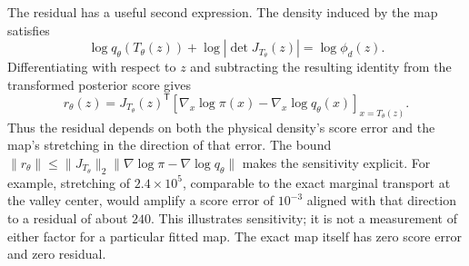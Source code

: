 The residual has a useful second expression. The density induced by the map
satisfies
\begin{equation}
 \log q_\theta(T_\theta(z))+\log|\det J_{T_\theta}(z)|
 =\log\phi_d(z).
\end{equation}
Differentiating with respect to $z$ and subtracting the resulting identity
from the transformed posterior score gives
\begin{equation}
 r_\theta(z)=J_{T_\theta}(z)^\mathsf T
 \left[\nabla_x\log\pi(x)-\nabla_x\log q_\theta(x)\right]_{x=T_\theta(z)}.
 \label{eq:controlled-score-error-amplification}
\end{equation}
Thus the residual depends on both the physical density's score error and the
map's stretching in the direction of that error. The bound
$\|r_\theta\|\leq\|J_{T_\theta}\|_2
\|\nabla\log\pi-\nabla\log q_\theta\|$ makes the sensitivity explicit.
For example, stretching of $2.4\times10^5$, comparable to the exact marginal
transport at the valley center, would amplify a score error of $10^{-3}$
aligned with that direction to a residual of about $240$. This illustrates
sensitivity; it is not a measurement of either factor for a particular fitted
map. The exact map itself has zero score error and zero residual.

